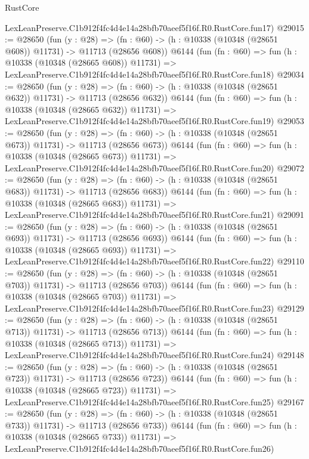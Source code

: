 \begin{lexlean}{RustCore}
\begin{coremodule}
    LexLeanPreserve.C1b912f4fc4d4e14a28bfb70aeef5f16f.R0.RustCore.fun17)
@29015 := @28650
    (fun (y : @28) =>
    (fn : @60) -> (h : @10338 (@10348 (@28651 @608)) @11731) -> @11713 (@28656 @608))
    @6144
    (fun (fn : @60) =>
    fun (h : @10338 (@10348 (@28665 @608)) @11731) =>
    LexLeanPreserve.C1b912f4fc4d4e14a28bfb70aeef5f16f.R0.RustCore.fun18)
@29034 := @28650
    (fun (y : @28) =>
    (fn : @60) -> (h : @10338 (@10348 (@28651 @632)) @11731) -> @11713 (@28656 @632))
    @6144
    (fun (fn : @60) =>
    fun (h : @10338 (@10348 (@28665 @632)) @11731) =>
    LexLeanPreserve.C1b912f4fc4d4e14a28bfb70aeef5f16f.R0.RustCore.fun19)
@29053 := @28650
    (fun (y : @28) =>
    (fn : @60) -> (h : @10338 (@10348 (@28651 @673)) @11731) -> @11713 (@28656 @673))
    @6144
    (fun (fn : @60) =>
    fun (h : @10338 (@10348 (@28665 @673)) @11731) =>
    LexLeanPreserve.C1b912f4fc4d4e14a28bfb70aeef5f16f.R0.RustCore.fun20)
@29072 := @28650
    (fun (y : @28) =>
    (fn : @60) -> (h : @10338 (@10348 (@28651 @683)) @11731) -> @11713 (@28656 @683))
    @6144
    (fun (fn : @60) =>
    fun (h : @10338 (@10348 (@28665 @683)) @11731) =>
    LexLeanPreserve.C1b912f4fc4d4e14a28bfb70aeef5f16f.R0.RustCore.fun21)
@29091 := @28650
    (fun (y : @28) =>
    (fn : @60) -> (h : @10338 (@10348 (@28651 @693)) @11731) -> @11713 (@28656 @693))
    @6144
    (fun (fn : @60) =>
    fun (h : @10338 (@10348 (@28665 @693)) @11731) =>
    LexLeanPreserve.C1b912f4fc4d4e14a28bfb70aeef5f16f.R0.RustCore.fun22)
@29110 := @28650
    (fun (y : @28) =>
    (fn : @60) -> (h : @10338 (@10348 (@28651 @703)) @11731) -> @11713 (@28656 @703))
    @6144
    (fun (fn : @60) =>
    fun (h : @10338 (@10348 (@28665 @703)) @11731) =>
    LexLeanPreserve.C1b912f4fc4d4e14a28bfb70aeef5f16f.R0.RustCore.fun23)
@29129 := @28650
    (fun (y : @28) =>
    (fn : @60) -> (h : @10338 (@10348 (@28651 @713)) @11731) -> @11713 (@28656 @713))
    @6144
    (fun (fn : @60) =>
    fun (h : @10338 (@10348 (@28665 @713)) @11731) =>
    LexLeanPreserve.C1b912f4fc4d4e14a28bfb70aeef5f16f.R0.RustCore.fun24)
@29148 := @28650
    (fun (y : @28) =>
    (fn : @60) -> (h : @10338 (@10348 (@28651 @723)) @11731) -> @11713 (@28656 @723))
    @6144
    (fun (fn : @60) =>
    fun (h : @10338 (@10348 (@28665 @723)) @11731) =>
    LexLeanPreserve.C1b912f4fc4d4e14a28bfb70aeef5f16f.R0.RustCore.fun25)
@29167 := @28650
    (fun (y : @28) =>
    (fn : @60) -> (h : @10338 (@10348 (@28651 @733)) @11731) -> @11713 (@28656 @733))
    @6144
    (fun (fn : @60) =>
    fun (h : @10338 (@10348 (@28665 @733)) @11731) =>
    LexLeanPreserve.C1b912f4fc4d4e14a28bfb70aeef5f16f.R0.RustCore.fun26)

\end{coremodule}
\end{lexlean}
